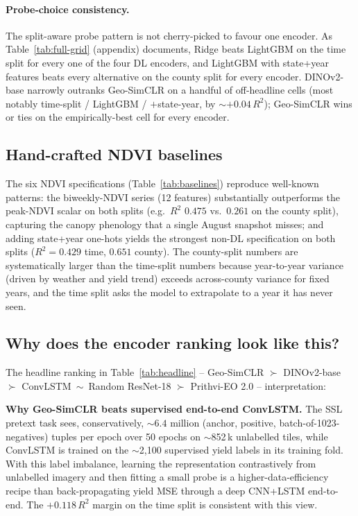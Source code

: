 \documentclass{article}
\begin{document}
\paragraph{Probe-choice consistency.} The split-aware probe pattern is not
cherry-picked to favour one encoder. As Table~\ref{tab:full-grid} (appendix)
documents, Ridge beats LightGBM on the time split for every one of the four
DL encoders, and LightGBM with state+year features beats every alternative on
the county split for every encoder. DINOv2-base narrowly outranks Geo-SimCLR
on a handful of off-headline cells (most notably time-split / LightGBM /
$+$state-year, by $\sim$$+0.04\,R^2$); Geo-SimCLR wins or ties on the
empirically-best cell for every encoder.

\subsection{Hand-crafted NDVI baselines}
The six NDVI specifications (Table~\ref{tab:baselines}) reproduce well-known
patterns: the biweekly-NDVI series (12 features) substantially outperforms the
peak-NDVI scalar on both splits (e.g.\ $R^2$ $0.475$ vs.\ $0.261$ on the
county split), capturing the canopy phenology that a single August snapshot
misses; and adding state+year one-hots yields the strongest non-DL specification
on both splits ($R^2 = 0.429$ time, $0.651$ county). The county-split numbers
are systematically larger than the time-split numbers because year-to-year
variance (driven by weather and yield trend) exceeds across-county variance
for fixed years, and the time split asks the model to extrapolate to a year
it has never seen.




\subsection{Why does the encoder ranking look like this?}
\label{sec:results-why}

The headline ranking in Table~\ref{tab:headline} -- Geo-SimCLR
$\succ$ DINOv2-base $\succ$ ConvLSTM \,$\sim$\, Random ResNet-18
$\succ$ Prithvi-EO 2.0 -- interpretation:

\textbf{Why Geo-SimCLR beats supervised end-to-end ConvLSTM.}
The SSL pretext task sees, conservatively, $\sim 6.4$ million
(anchor, positive, batch-of-1023-negatives) tuples per epoch over 50 epochs
on $\sim$852\,k unlabelled tiles, while ConvLSTM is trained on the
$\sim$2{,}100 supervised yield labels in its training fold. With this label
imbalance, learning the representation contrastively from unlabelled imagery
and then fitting a small probe is a higher-data-efficiency recipe than
back-propagating yield MSE through a deep CNN+LSTM end-to-end. The
$+0.118\,R^2$ margin on the time split is consistent with this view.
\end{document}
